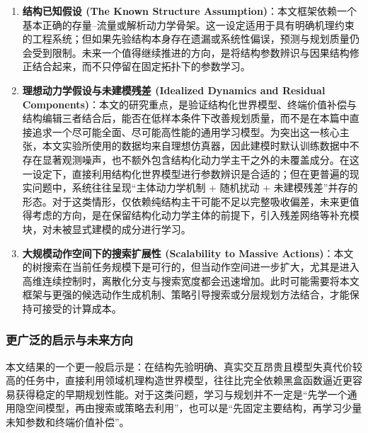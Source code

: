 \documentclass[UTF8]{ctexart}
\begin{document}
\begin{enumerate}
\item \textbf{结构已知假设 (The Known Structure Assumption)}：本文框架依赖一个基本正确的存量--流量或解析动力学骨架。这一设定适用于具有明确机理约束的工程系统；但如果先验结构本身存在遗漏或系统性偏误，预测与规划质量仍会受到限制。未来一个值得继续推进的方向，是将结构参数辨识与因果结构修正结合起来，而不只停留在固定拓扑下的参数学习。
\item \textbf{理想动力学假设与未建模残差 (Idealized Dynamics and Residual Components)}：本文的研究重点，是验证结构化世界模型、终端价值补偿与结构编辑三者结合后，能否在低样本条件下改善规划质量，而不是在本篇中直接追求一个尽可能全面、尽可能高性能的通用学习模型。为突出这一核心主张，本文实验所使用的数据均来自理想仿真器，因此建模时默认训练数据中不存在显著观测噪声，也不额外包含结构化动力学主干之外的未覆盖成分。在这一设定下，直接利用结构化世界模型进行参数辨识是合适的；但在更普遍的现实问题中，系统往往呈现“主体动力学机制 + 随机扰动 + 未建模残差”并存的形态。对于这类情形，仅依赖纯结构主干可能不足以完整吸收偏差，未来更值得考虑的方向，是在保留结构化动力学主体的前提下，引入残差网络等补充模块，对未被显式建模的成分进行学习。
\item \textbf{大规模动作空间下的搜索扩展性 (Scalability to Massive Actions)}：本文的树搜索在当前任务规模下是可行的，但当动作空间进一步扩大，尤其是进入高维连续控制时，离散化分支与搜索宽度都会迅速增加。此时可能需要将本文框架与更强的候选动作生成机制、策略引导搜索或分层规划方法结合，才能保持可接受的计算成本。
\end{enumerate}

\hypertarget{ux5e7fux4e49-neuro-orux4e0bux4e00ux4e2aux524dux6cbf-towards-generalized-neuro-or}{%
\subsubsection{更广泛的启示与未来方向}\label{ux5e7fux4e49-neuro-orux4e0bux4e00ux4e2aux524dux6cbf-towards-generalized-neuro-or}}

本文结果的一个更一般启示是：在结构先验明确、真实交互昂贵且模型失真代价较高的任务中，直接利用领域机理构造世界模型，往往比完全依赖黑盒函数逼近更容易获得稳定的早期规划性能。对于这类问题，学习与规划并不一定是“先学一个通用隐空间模型，再由搜索或策略去利用”，也可以是“先固定主要结构，再学习少量未知参数和终端价值补偿”。
\end{document}
